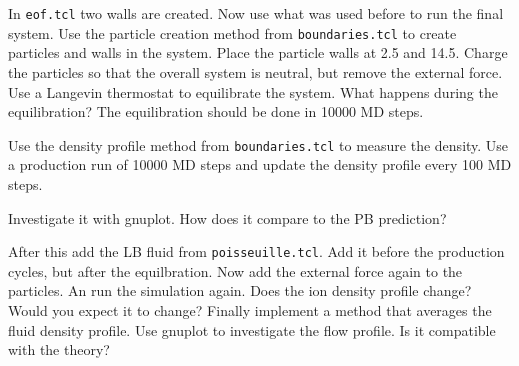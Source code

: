 In \lstinline|eof.tcl| two walls are created. Now use what was
used before to run the final system. Use the particle
creation method from \lstinline|boundaries.tcl| to
create particles and walls in the system. Place the particle
walls at 2.5 and 14.5. Charge the particles so that
the overall system is neutral, but remove the external force. 
Use a Langevin thermostat
to equilibrate the system. What happens during the equilibration?
The equilibration should be done in 10000 MD steps.

Use the density profile method from \lstinline|boundaries.tcl| 
to measure the density. Use a production run of 10000 MD steps
and update the density profile every 100 MD steps.

Investigate it with gnuplot. How does it compare to the 
PB prediction?

After this add the LB fluid from \lstinline|poisseuille.tcl|.
Add it before the production cycles, but after the equilbration.
Now add the external force again to the particles. An run the 
simulation again. Does the ion density profile change? Would
you expect it to change? Finally implement a method that averages
the fluid density profile. Use gnuplot to investigate
the flow profile. Is it compatible with the theory?














